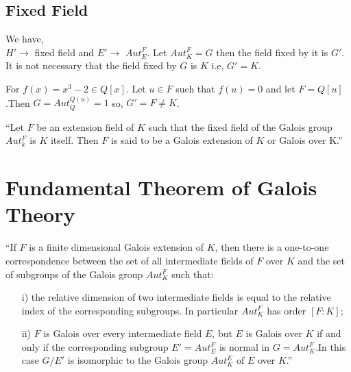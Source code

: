 \subsection{Fixed Field}
We have,\\
\(H' \rightarrow\) fixed field and \(E' \rightarrow\) \(Aut_E^F\).\hspace{5mm} Let \(Aut_K^F = G\) then the field fixed by it is \(G'\). It is not necessary that the field fixed by \(G\) is \(K\) i.e, \(G'=K\).
\vspace{3mm}
\begin{example}
  For \(f(x)=x^3-2 \in Q[x]\). Let \(u \in F\) such that \(f(u)=0\) and let \(F=Q[u]\).Then
  \(G=Aut_Q^{Q(u)}={1}\) so, \hspace{5mm}\(G'=F \neq K\).
\end{example}

\vspace{3mm}
\begin{definition} \cite{hunger}
``Let \(F\) be an extension field of \(K\) such that the fixed field of the Galois group \(Aut_k^F\) is \(K\) itself. Then \(F\) is said to be a Galois extension of \(K\) or Galois over K.''
\end{definition}

\section{Fundamental Theorem of Galois Theory}
\begin{tcolorbox}
\begin{theorem} \cite{hunger}
  ``If \(F\) is a finite dimensional Galois extension of \(K\), then there is a one-to-one correspondence between the set of all intermediate fields of \(F\) over \(K\) and the set of subgroups of the Galois group \(Aut_K^F\) such that:
  \begin{enumerate}
  \item[i)] the relative dimension of two intermediate fields is equal to the relative index of the corresponding subgroups. In particular \(Aut_K^F\) has order \([F:K]\);
  \item[ii)] \(F\) is Galois over every intermediate field \(E\), but \(E\) is Galois over \(K\) if and only if the corresponding subgroup \(E'= Aut_E^F\) is normal in \(G=Aut_K^F\).In this case \(G/E'\) is isomorphic to the Galois group \(Aut_K^E\) of \(E\) over \(K\).''
  \end{enumerate}
\end{theorem}
\end{tcolorbox}

